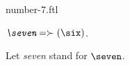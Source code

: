 \documentclass{stex}
\begin{document}
\begin{smodule}{number-7.ftl}



\begin{definition}[forthel,id=SevenDef]
  $\emph{\seven} = \succ(\six)$.

  Let \emph{seven} stand for $\seven$.
\end{definition}

\end{smodule}
\end{document}
